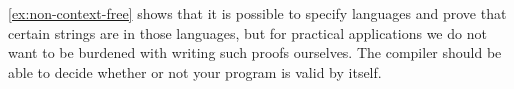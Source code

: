 \cref{ex:non-context-free} shows that it is possible to specify languages and prove that certain strings are in those languages, but for practical applications we do not want to be burdened with writing such proofs ourselves. The compiler should be able to decide whether or not your program is valid by itself.
\begin{code}[hide]%
\>[0]\AgdaSpace{}%
\AgdaSpace{}%
\AgdaSpace{}%
\AgdaSpace{}%
\AgdaSymbol{:}\AgdaSpace{}%
\<%
\\
%
\\[\AgdaEmptyExtraSkip]%
\>[0]\AgdaSpace{}%
\AgdaSpace{}%
\<%
\end{code}

\begin{figure}
\begin{minipage}{.36\textwidth}
\begin{code}%
\>[0][@{}l@{\AgdaIndent{1}}]%
\>[4]\AgdaSpace{}%
\AgdaSymbol{:}\AgdaSpace{}%
\<%
\\
%
\>[4]\AgdaSpace{}%
\AgdaSymbol{\AgdaUnderscore{}}\AgdaSpace{}%
\AgdaSymbol{=}\AgdaSpace{}%
\<%
\end{code}
\begin{code}%
%
\>[4]\AgdaSpace{}%
\AgdaSymbol{:}\AgdaSpace{}%
\<%
\\
%
\>[4]\AgdaSpace{}%
\AgdaSpace{}%
\AgdaSymbol{=}\AgdaSpace{}%
\AgdaSpace{}%
\AgdaSpace{}%
\AgdaInductiveConstructor{[]}\<%
\end{code}
\begin{code}%
%
\>[4]\AgdaSpace{}%
\AgdaSymbol{:}\AgdaSpace{}%
\AgdaSpace{}%
\AgdaSpace{}%
\AgdaSpace{}%
\AgdaSpace{}%
\<%
\\
%
\>[4]\AgdaSymbol{(}\AgdaSpace{}%
\AgdaSpace{}%
\AgdaSymbol{)}\AgdaSpace{}%
\AgdaSpace{}%
\AgdaSymbol{=}\AgdaSpace{}%
\AgdaSpace{}%
\AgdaSpace{}%
\AgdaSpace{}%
\AgdaSpace{}%
\<%
\end{code}
\end{minipage} \quad

\end{figure}
